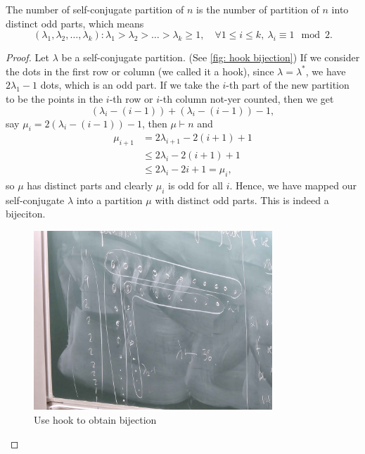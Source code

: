 \begin{proposition}
    The number of self-conjugate partition of \(n\) is the number of partition of \(n\) into distinct odd parts, which means
    \[
        (\lambda _1, \lambda _2, \dots , \lambda _k) : \lambda _1 > \lambda _2 > \dots > \lambda _k \ge 1, \quad \forall 1 \le i \le k, \ \lambda _i \equiv 1 \mod{2}.
    \]  
\end{proposition}
\begin{proof}
    Let \(\lambda \) be a self-conjugate partition. (See \autoref{fig: hook bijection}) If we consider the dots in the first row or column (we called it a hook), since \(\lambda = \lambda ^*\), we have \(2\lambda_1 - 1\) dots, which is an odd part. If we take the \(i\)-th part of the new partition to be the points in the \(i\)-th row or \(i\)-th column not-yer counted, then we get 
    \[
        (\lambda _i - (i - 1)) + (\lambda _i - (i - 1)) - 1,
    \]      say \(\mu _i = 2\left( \lambda _i - (i - 1) \right) - 1 \), then \(\mu \vdash n\) and
    \begin{align*}
        \mu _{i + 1} &= 2 \lambda _{i + 1} - 2(i + 1) + 1 \\
        &\le 2\lambda _i - 2(i + 1) + 1 \\
        &\le 2\lambda _i - 2i + 1 = \mu _i,
    \end{align*}  
    so \(\mu \) has distinct parts and clearly \(\mu _i\) is odd for all \(i\). Hence, we have mapped our self-conjugate \(\lambda \) into a partition \(\mu \) with distinct odd parts. This is indeed a bijeciton.  
    \begin{figure}[H]
        \centering
        \includegraphics[width=0.8\textwidth]{./Figures/20250923_161129.jpg}
        \caption{Use hook to obtain bijection}
        \label{fig: hook bijection}
    \end{figure}
    
        
\end{proof}

